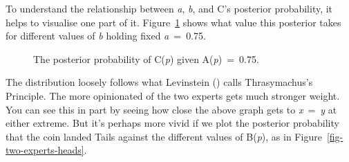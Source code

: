 \documentclass[
  10pt,
  letterpaper,
  DIV=11,
  numbers=noendperiod,
  twoside]{scrartcl}
\begin{document}
To understand the relationship between \emph{a}, \emph{b}, and C's
posterior probability, it helps to visualise one part of it.
Figure~\ref{fig-two-experts} shows what value this posterior takes for
different values of \emph{b} holding fixed \emph{a}~=~0.75.

\begin{figure}


\caption{\label{fig-two-experts}The posterior probability of C(\emph{p})
given A(\emph{p})~=~0.75.}

\end{figure}%

The distribution loosely follows what Levinstein
() calls Thrasymachus's Principle.
The more opinionated of the two experts gets much stronger weight. You
can see this in part by seeing how close the above graph gets to
\emph{x}~=~\emph{y} at either extreme. But it's perhaps more vivid if we
plot the posterior probability that the coin landed Tails against the
different values of B(\emph{p}), as in
Figure~\ref{fig-two-experts-heads}.
\end{document}
